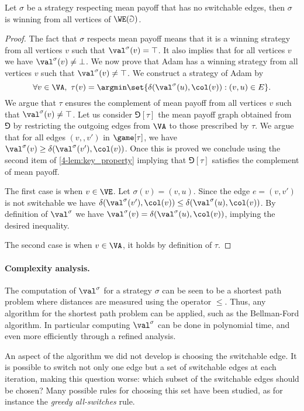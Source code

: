 \begin{lemma}[Optimality]\label{4-lem:optimality}
Let $\sigma$ be a strategy respecting mean payoff that has no switchable edges, then 
$\sigma$ is winning from all vertices of $\WE(\Game)$.
\end{lemma}

\begin{proof}
The fact that $\sigma$ respects mean payoff means that it is a winning strategy
from all vertices $v$ such that $\val^\sigma(v) = \top$.
It also implies that for all vertices $v$ we have $\val^{\sigma}(v) \neq \bot$.
We now prove that Adam has a winning strategy from all vertices $v$ such that $\val^{\sigma}(v) \neq \top$.
We construct a strategy of Adam by
\[
\forall v \in \VA,\ \tau(v) = \argmin \set{ \delta(\val^{\sigma}(u),\col(v)) : (v,u) \in E }.
\]
We argue that $\tau$ ensures the complement of mean payoff from all vertices $v$ such that $\val^{\sigma}(v) \neq \top$.
Let us consider $\Game[\tau]$ the mean payoff graph obtained from $\Game$ by restricting the outgoing edges from $\VA$
to those prescribed by $\tau$.
We argue that for all edges $(v,,v')$ in $\game[\tau]$, we have 
$\val^{\sigma}(v) \ge \delta(\val^{\sigma}(v'),\col(v))$.
Once this is proved we conclude using the second item of \cref{4-lem:key_property} implying that $\Game[\tau]$ satisfies the complement of mean payoff.

The first case is when $v \in \VE$. 
Let $\sigma(v) = (v,u)$.
Since the edge $e = (v,v')$ is not switchable we have 
$\delta(\val^{\sigma}(v'),\col(v)) \le \delta(\val^{\sigma}(u),\col(v))$.
By definition of $\val^\sigma$ we have $\val^\sigma(v) = \delta(\val^{\sigma}(u),\col(v))$,
implying the desired inequality.

The second case is when $v \in \VA$, it holds by definition of $\tau$.
\end{proof}

\paragraph{\bf Complexity analysis.}
The computation of $\val^\sigma$ for a strategy $\sigma$ can be seen to be a shortest path problem where distances are measured using the operator $\le$. 
Thus, any algorithm for the shortest path problem can be applied, such as the Bellman-Ford algorithm.
In particular computing $\val^\sigma$ can be done in polynomial time, and even more efficiently through a refined analysis.

An aspect of the algorithm we did not develop is choosing the switchable edge.
It is possible to switch not only one edge but a set of switchable edges at each iteration, making this question worse: 
which subset of the switchable edges should be chosen?
Many possible rules for choosing this set have been studied, as for instance the \emph{greedy all-switches} rule. 

